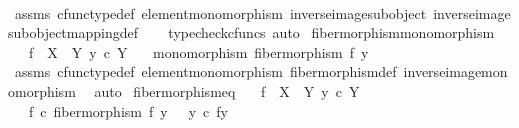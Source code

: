 \begin{isabellebody}
\ \ \isamarkupfalse%
\ assms\ cfunc{\isacharunderscore}{\kern0pt}type{\isacharunderscore}{\kern0pt}def\ element{\isacharunderscore}{\kern0pt}monomorphism\ inverse{\isacharunderscore}{\kern0pt}image{\isacharunderscore}{\kern0pt}subobject\ inverse{\isacharunderscore}{\kern0pt}image{\isacharunderscore}{\kern0pt}subobject{\isacharunderscore}{\kern0pt}mapping{\isacharunderscore}{\kern0pt}def\isanewline
\ \ \isamarkupfalse%
\ {\isacharparenleft}{\kern0pt}typecheck{\isacharunderscore}{\kern0pt}cfuncs{\isacharcomma}{\kern0pt}\ auto{\isacharparenright}{\kern0pt}%
\endisatagproof
{\isafoldproof}%
%
\isadelimproof
\isanewline
%
\endisadelimproof
\isanewline
{}\isamarkupfalse%
\ fiber{\isacharunderscore}{\kern0pt}morphism{\isacharunderscore}{\kern0pt}monomorphism{\isacharcolon}{\kern0pt}\isanewline
\ \ \ {\isachardoublequoteopen}f\ {\isacharcolon}{\kern0pt}\ X\ {\isasymrightarrow}\ Y{\isachardoublequoteclose}\ {\isachardoublequoteopen}y\ {\isasymin}\isactrlsub c\ Y{\isachardoublequoteclose}\isanewline
\ \ \ {\isachardoublequoteopen}monomorphism\ {\isacharparenleft}{\kern0pt}fiber{\isacharunderscore}{\kern0pt}morphism\ f\ y{\isacharparenright}{\kern0pt}{\isachardoublequoteclose}\isanewline
%
\isadelimproof
\ \ %
\endisadelimproof
%
\isatagproof
{}\isamarkupfalse%
\ assms\ cfunc{\isacharunderscore}{\kern0pt}type{\isacharunderscore}{\kern0pt}def\ element{\isacharunderscore}{\kern0pt}monomorphism\ fiber{\isacharunderscore}{\kern0pt}morphism{\isacharunderscore}{\kern0pt}def\ inverse{\isacharunderscore}{\kern0pt}image{\isacharunderscore}{\kern0pt}monomorphism\ \isamarkupfalse%
\ auto%
\endisatagproof
{\isafoldproof}%
%
\isadelimproof
\isanewline
%
\endisadelimproof
\isanewline
{}\isamarkupfalse%
\ fiber{\isacharunderscore}{\kern0pt}morphism{\isacharunderscore}{\kern0pt}eq{\isacharcolon}{\kern0pt}\isanewline
\ \ \ {\isachardoublequoteopen}f\ {\isacharcolon}{\kern0pt}\ X\ {\isasymrightarrow}\ Y{\isachardoublequoteclose}\ {\isachardoublequoteopen}y\ {\isasymin}\isactrlsub c\ Y{\isachardoublequoteclose}\isanewline
\ \ \ {\isachardoublequoteopen}f\ {\isasymcirc}\isactrlsub c\ fiber{\isacharunderscore}{\kern0pt}morphism\ f\ y\ \ {\isacharequal}{\kern0pt}\ y\ {\isasymcirc}\isactrlsub c\ {\isasymbeta}\isactrlbsub f\isactrlsup {\isacharminus}{\kern0pt}y{\isacharbraceright}{\kern0pt}\isactrlesub {\isachardoublequoteclose}\isanewline
%
\isadelimproof
%
\endisadelimproof

\end{isabellebody}
